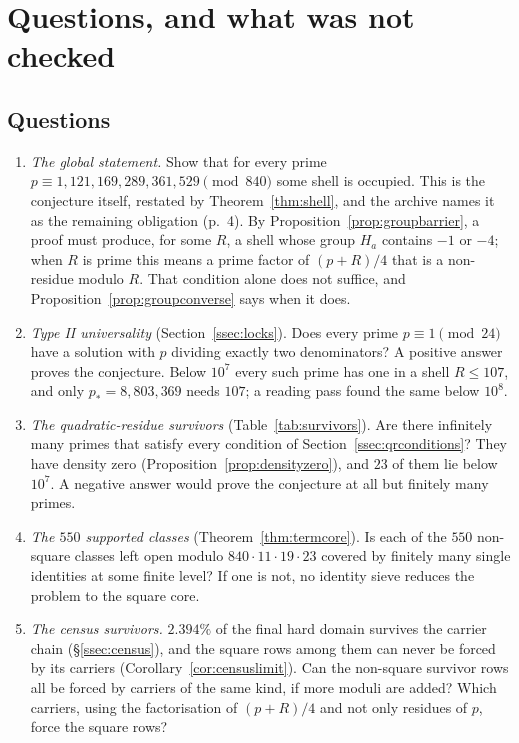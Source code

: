 \section{Questions, and what was not checked}\label{sec:open}

\subsection{Questions}

\begin{enumerate}[label=\arabic*.,ref=\arabic*]
\item\label{q:global} \emph{The global statement.} Show that for every prime $p\equiv1,121,169,289,361,529\pmod{840}$ some shell is occupied. This is the conjecture itself, restated by Theorem~\ref{thm:shell}, and the archive names it as the remaining obligation (p.~4). By Proposition~\ref{prop:groupbarrier}, a proof must produce, for some $R$, a shell whose group $H_a$ contains $-1$ or $-4$; when $R$ is prime this means a prime factor of $(p+R)/4$ that is a non-residue modulo $R$. That condition alone does not suffice, and Proposition~\ref{prop:groupconverse} says when it does.
\item\label{q:typeII} \emph{Type II universality} (Section~\ref{ssec:locks}). Does every prime $p\equiv1\pmod{24}$ have a solution with $p$ dividing exactly two denominators? A positive answer proves the conjecture. Below $10^7$ every such prime has one in a shell $R\le107$, and only $p_*=8{,}803{,}369$ needs $107$; a reading pass found the same below $10^8$.
\item\label{q:qrsurvivors} \emph{The quadratic-residue survivors} (Table~\ref{tab:survivors}). Are there infinitely many primes that satisfy every condition of Section~\ref{ssec:qrconditions}? They have density zero (Proposition~\ref{prop:densityzero}), and $23$ of them lie below $10^7$. A negative answer would prove the conjecture at all but finitely many primes.
\item\label{q:550} \emph{The $550$ supported classes} (Theorem~\ref{thm:termcore}). Is each of the $550$ non-square classes left open modulo $840\cdot11\cdot19\cdot23$ covered by finitely many single identities at some finite level? If one is not, no identity sieve reduces the problem to the square core.
\item\label{q:census} \emph{The census survivors.} $2.394\%$ of the final hard domain survives the carrier chain (§\ref{ssec:census}), and the square rows among them can never be forced by its carriers (Corollary~\ref{cor:censuslimit}). Can the non-square survivor rows all be forced by carriers of the same kind, if more moduli are added? Which carriers, using the factorisation of $(p+R)/4$ and not only residues of $p$, force the square rows?

\end{enumerate}
